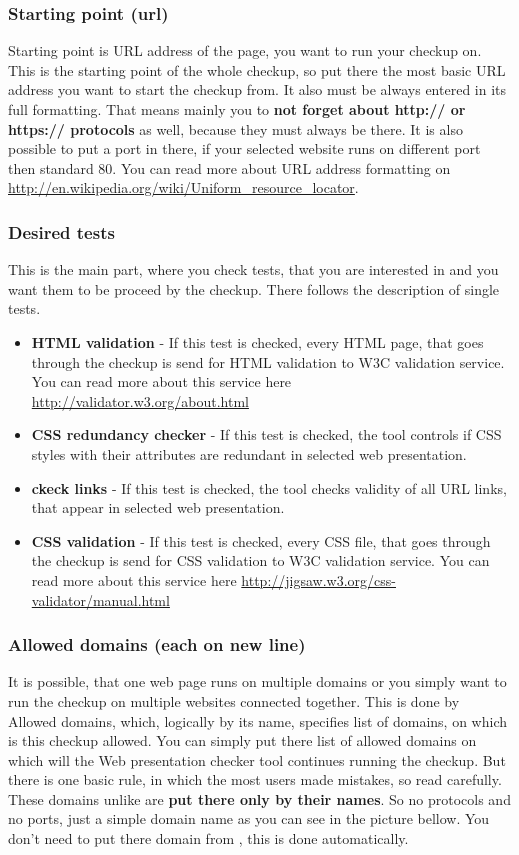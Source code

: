 \documentclass[12pt,a4paper]{article}
\begin{document}
\subsubsection{Starting point (url)} \label{address}
Starting point is URL address of the page, you want to run your checkup on. This is the starting point of the whole checkup, so put there the most basic URL address you want to start the checkup from. It also must be always entered in its full formatting. That means mainly you to \textbf{not forget about http://  or https:// protocols} as well, because they must always be there. It is also possible to put a port in there, if your selected website runs on different port then standard 80. You can read more about URL address formatting on \url{http://en.wikipedia.org/wiki/Uniform_resource_locator}.

\subsubsection{Desired tests}
This is the main part, where you check tests, that you are interested in and you want them to be proceed by the checkup.
There follows the description of single tests.
\begin{itemize}
	\item \textbf{HTML validation} - If this test is checked, every HTML page, that goes through the checkup is send for HTML validation to W3C validation service. You can read more about this service here \url{http://validator.w3.org/about.html}
	\item \textbf{CSS redundancy checker} - If this test is checked, the tool controls if CSS styles with their attributes are redundant in selected web presentation.
	\item \textbf{ckeck links} - If this test is checked, the tool checks validity of all URL links, that appear in selected web presentation.
	\item \textbf{CSS validation} - If this test is checked, every CSS file, that goes through the checkup is send for CSS validation to W3C validation service. You can read more about this service here \url{http://jigsaw.w3.org/css-validator/manual.html}
\end{itemize}

\subsubsection{Allowed domains (each on new line)}
It is possible, that one web page runs on multiple domains or you simply want to run the checkup on multiple websites connected together. This is done by Allowed domains, which, logically by its name, specifies list of domains, on which is this checkup allowed. You can simply put there list of allowed domains on which will the Web presentation checker tool continues running the checkup. But there is one basic rule, in which the most users made mistakes, so read carefully. These domains unlike  are \textbf{put there only by their names}. So no protocols and no ports, just a simple domain name as you can see in the picture bellow. You don't need to put there domain from , this is done automatically.
\end{document}
